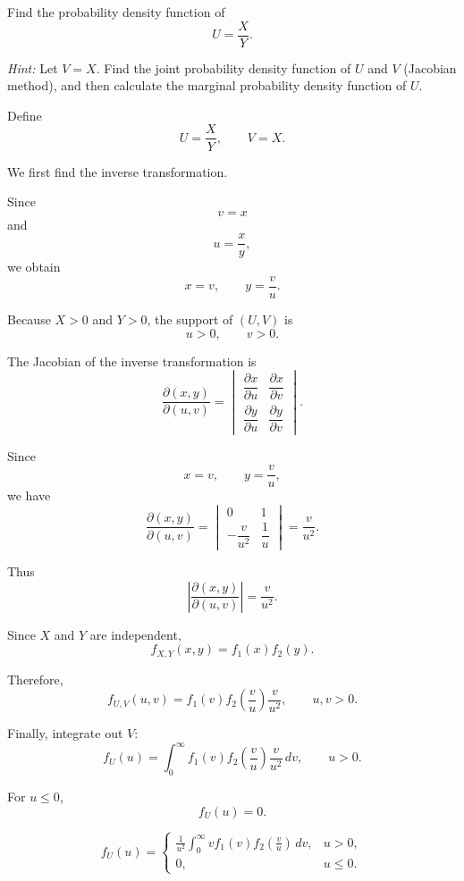 \documentclass[11pt]{article}
\begin{document}
Find the probability density function of
\[
U=\frac{X}{Y}.
\]

\textit{Hint:} Let \(V=X\). Find the joint probability density function of
\(U\) and \(V\) (Jacobian method), and then calculate the marginal probability density function
of \(U\).

\begin{solutionbox}

Define
\[
U=\frac{X}{Y},
\qquad
V=X.
\]

We first find the inverse transformation.

Since
\[
v=x
\]
and
\[
u=\frac{x}{y},
\]
we obtain
\[
x=v,
\qquad
y=\frac{v}{u}.
\]

Because \(X>0\) and \(Y>0\), the support of \((U,V)\) is
\[
u>0,\qquad v>0.
\]

The Jacobian of the inverse transformation is
\[
\frac{\partial(x,y)}{\partial(u,v)}
=
\begin{vmatrix}
\dfrac{\partial x}{\partial u}
&
\dfrac{\partial x}{\partial v}
\\[2mm]
\dfrac{\partial y}{\partial u}
&
\dfrac{\partial y}{\partial v}
\end{vmatrix}.
\]

Since
\[
x=v,
\qquad
y=\frac vu,
\]
we have
\[
\frac{\partial(x,y)}{\partial(u,v)}
=
\begin{vmatrix}
0 & 1\\[2mm]
-\dfrac{v}{u^2} & \dfrac1u
\end{vmatrix}
=
\frac{v}{u^2}.
\]

Thus
\[
\left|
\frac{\partial(x,y)}{\partial(u,v)}
\right|
=
\frac{v}{u^2}.
\]

Since \(X\) and \(Y\) are independent,
\[
f_{X,Y}(x,y)=f_1(x)f_2(y).
\]

Therefore,
\[
f_{U,V}(u,v)
=
f_1(v)
f_2\left(\frac vu\right)
\frac{v}{u^2},
\qquad u,v>0.
\]

Finally, integrate out \(V\):
\[
f_U(u)
=
\int_0^\infty
f_1(v)
f_2\left(\frac vu\right)
\frac{v}{u^2}\,dv,
\qquad u>0.
\]

For \(u\leq0\),
\[
f_U(u)=0.
\]

\begin{finalanswerbox}

\[
f_U(u)
=
\begin{cases}
\displaystyle
\frac{1}{u^2}
\int_0^\infty
v f_1(v)
f_2\left(\frac vu\right)\,dv,
& u>0,\\[4mm]
0,
& u\leq0.
\end{cases}
\]

\end{finalanswerbox}

\end{solutionbox}
\end{document}
